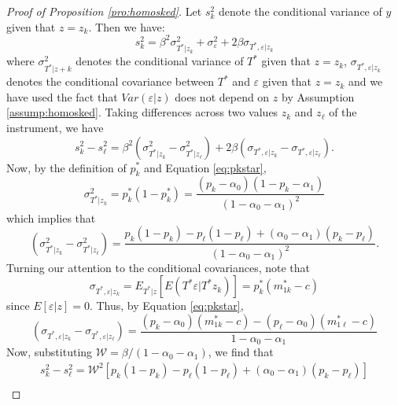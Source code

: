\begin{proof}[Proof of Proposition \ref{pro:homosked}]
  Let $s^2_k$ denote the conditional variance of $y$ given that $z=z_k$.
  Then we have:
\begin{equation}
  s_k^2 = \beta^2 \sigma^2_{T^*|z_k} + \sigma^2_\varepsilon + 2\beta \sigma_{T^*,\varepsilon|z_k}
\end{equation}
where $\sigma^2_{T^*|z+k}$ denotes the conditional variance of $T^*$ given that $z = z_k$, $\sigma_{T^*,\varepsilon|z_k}$ denotes the conditional covariance between $T^*$ and $\varepsilon$ given that $z=z_k$ and we have used the fact that $Var(\varepsilon|z)$ does not depend on $z$ by Assumption \ref{assump:homosked}.
Taking differences across two values $z_k$ and $z_\ell$ of the instrument, we have
\begin{equation}
  s^2_k - s^2_\ell = \beta^2\left( \sigma^2_{T^*|z_k} - \sigma^2_{T^*|z_\ell} \right) + 2\beta \left( \sigma_{T^*,\varepsilon|z_k} - \sigma_{T^*,\varepsilon|z_\ell} \right).
\end{equation}
Now, by the definition of $p^*_k$ and Equation \ref{eq:pkstar},
\begin{equation}
  \sigma^2_{T^*|z_k}= p^*_k (1-p^*_k) = \frac{(p_k - \alpha_0)(1 - p_k - \alpha_1)}{(1 - \alpha_0 - \alpha_1)^2} 
\end{equation}
which implies that 
\begin{equation}
  \left( \sigma^2_{T^*|z_k} - \sigma^2_{T^*|z_\ell} \right)= \frac{p_k(1-p_k) - p_\ell(1-p_\ell) + (\alpha_0 - \alpha_1)(p_k - p_\ell)}{(1 - \alpha_0 - \alpha_1)^2}.
\end{equation}
Turning our attention to the conditional covariances, note that
\begin{equation}
  \sigma_{T^*,\varepsilon|z_k} = E_{T^*|z}\left[E\left( T^*\varepsilon|T^*z_k \right)  \right] = p_k^* (m^*_{1k}-c) 
\end{equation}
since $E[\varepsilon|z] = 0$.
Thus, by Equation \ref{eq:pkstar},
\begin{equation}
  \left( \sigma_{T^*,\varepsilon|z_k} - \sigma_{T^*,\varepsilon|z_\ell} \right) = \frac{(p_k - \alpha_0)(m^*_{1k}-c) - (p_\ell - \alpha_0)(m^*_{1\ell}-c)}{1 - \alpha_0 - \alpha_1} 
\end{equation}
Now, substituting $\mathcal{W} = \beta/(1-\alpha_0-\alpha_1)$, we find that
\begin{align*}
  s^2_k - s^2_\ell = \mathcal{W}^2\left[p_k(1-p_k) - p_\ell(1-p_\ell) + (\alpha_0 - \alpha_1)(p_k - p_\ell)\right]\\  

\end{align*}
\end{proof}
